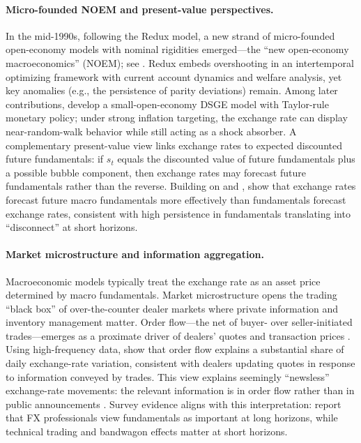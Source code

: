 \documentclass[a4paper,10pt,final]{article}    %
\begin{document}
\paragraph{Micro-founded NOEM and present-value perspectives.}
In the mid-1990s, following the \citet{ObstfeldRogoff1995} Redux model, a new strand of micro-founded open-economy models with nominal rigidities emerged---the ``new open-economy macroeconomics'' (NOEM); see \citet{Lane2001}. Redux embeds overshooting in an intertemporal optimizing framework with current account dynamics and welfare analysis, yet key anomalies (e.g., the persistence of parity deviations) remain. Among later contributions, \citet{GaliMonacelli2005} develop a small-open-economy DSGE model with Taylor-rule monetary policy; under strong inflation targeting, the exchange rate can display near-random-walk behavior while still acting as a shock absorber.
A complementary present-value view links exchange rates to expected discounted future fundamentals: if $s_t$ equals the discounted value of future fundamentals plus a possible bubble component, then exchange rates may forecast future fundamentals rather than the reverse. Building on \citet{Lucas1982} and \citet{FrenkelMussa1985}, \citet{EngelWest2005} show that exchange rates forecast future macro fundamentals more effectively than fundamentals forecast exchange rates, consistent with high persistence in fundamentals translating into ``disconnect'' at short horizons.

\paragraph{Market microstructure and information aggregation.}
Macroeconomic models typically treat the exchange rate as an asset price determined by macro fundamentals. Market microstructure opens the trading ``black box'' of over-the-counter dealer markets where private information and inventory management matter. Order flow---the net of buyer- over seller-initiated trades---emerges as a proximate driver of dealers' quotes and transaction prices \citep{Evans2011}. Using high-frequency data, \citet{EvansLyons2002} show that order flow explains a substantial share of daily exchange-rate variation, consistent with dealers updating quotes in response to information conveyed by trades. This view explains seemingly ``newsless'' exchange-rate movements: the relevant information is in order flow rather than in public announcements \citep{Lyons2001}. Survey evidence aligns with this interpretation: \citet{CheungChinn2001} report that FX professionals view fundamentals as important at long horizons, while technical trading and bandwagon effects matter at short horizons.
\end{document}
